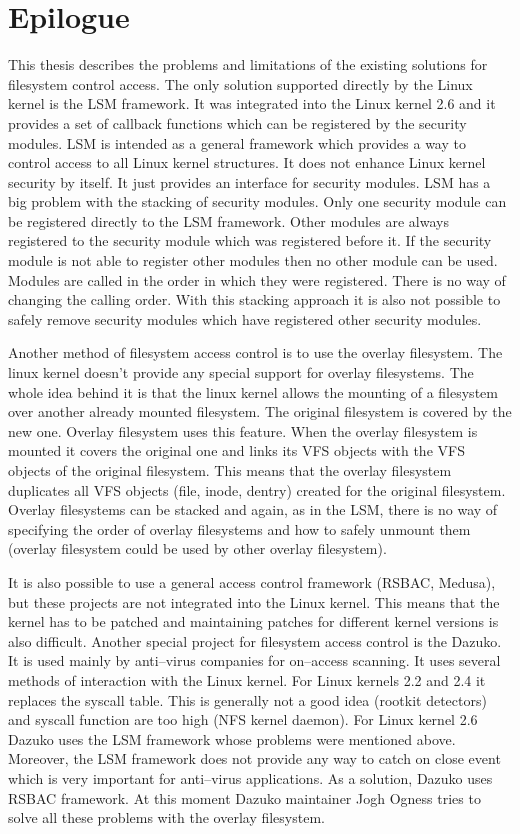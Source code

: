 \chapter{Epilogue}
This thesis describes the problems and limitations of the existing solutions for
filesystem control access. The only solution supported directly by the Linux kernel is
the LSM framework. It was integrated into the Linux kernel 2.6 and it provides a set
of callback functions which can be registered by the security modules. LSM is intended
as a general framework which provides a way to control access to all Linux kernel
structures. It does not enhance Linux kernel security by itself. It just provides an
interface for security modules. LSM has a big problem with the stacking of security
modules. Only one security module can be registered directly to the LSM framework.
Other modules are always registered to the security module which was registered before
it. If the security module is not able to register other modules then no other module
can be used. Modules are called in the order in which they were registered. There is
no way of changing the calling order. With this stacking approach it is also not
possible to safely remove security modules which have registered other security
modules.

Another method of filesystem access control is to use the overlay filesystem. The linux
kernel doesn't provide any special support for overlay filesystems. The whole idea
behind it is that the linux kernel allows the mounting of a filesystem over another
already mounted filesystem. The original filesystem is covered by the new one. Overlay
filesystem uses this feature. When the overlay filesystem is mounted it covers the
original one and links its VFS objects with the VFS objects of the original
filesystem. This means that the overlay filesystem duplicates all VFS objects (file,
inode, dentry) created for the original filesystem. Overlay filesystems can be stacked
and again, as in the LSM, there is no way of specifying the order of overlay
filesystems and how to safely unmount them (overlay filesystem could be used by other
overlay filesystem).

It is also possible to use a general access control framework (RSBAC, Medusa), but
these projects are not integrated into the Linux kernel. This means that the kernel has
to be patched and maintaining patches for different kernel versions is also difficult.
Another special project for filesystem access control is the Dazuko. It is used mainly
by anti--virus companies for on--access scanning. It uses several methods of interaction
with the Linux kernel. For Linux kernels 2.2 and 2.4 it replaces the syscall table.
This is generally not a good idea (rootkit detectors) and syscall function are too
high (NFS kernel daemon). For Linux kernel 2.6 Dazuko uses the LSM framework whose
problems were mentioned above. Moreover, the LSM framework does not provide any way to
catch on close event which is very important for anti--virus applications. As a
solution, Dazuko uses RSBAC framework. At this moment Dazuko maintainer Jogh Ogness
tries to solve all these problems with the overlay filesystem.


